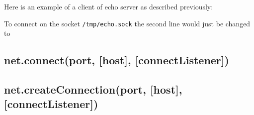 Here is an example of a client of echo server as described previously:

\begin{Shaded}
\begin{Highlighting}[]
 \NormalTok{(}\NormalTok{);}
 \NormalTok{(\{}\NormalTok{: }\NormalTok{\},}
    \NormalTok{() \{ }
  \NormalTok{(}\NormalTok{);}
  \NormalTok{(}\NormalTok{);}
\NormalTok{\});}
\NormalTok{(}\NormalTok{, }
  \NormalTok{(}\NormalTok{());}
  \NormalTok{();}
\NormalTok{\});}
\NormalTok{(}\NormalTok{, }\NormalTok{() \{}
  \NormalTok{(}\NormalTok{);}
\NormalTok{\});}
\end{Highlighting}
\end{Shaded}

To connect on the socket \texttt{/tmp/echo.sock} the second line would
just be changed to

\begin{Shaded}
\begin{Highlighting}[]
 \NormalTok{(\{}\NormalTok{: }\NormalTok{\});}
\end{Highlighting}
\end{Shaded}

\subsection{net.connect(port, {[}host{]},
{[}connectListener{]})}\label{net.connectport-host-connectlistener}

\subsection{net.createConnection(port, {[}host{]},
{[}connectListener{]})}\label{net.createconnectionport-host-connectlistener}

